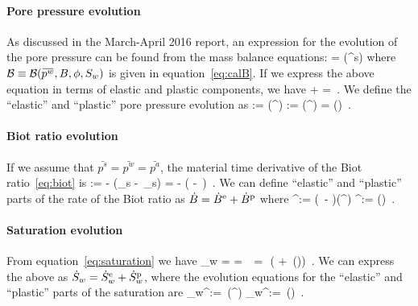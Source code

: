 \documentclass[11pt,a4paper]{article}
\begin{document}
  \paragraph{Pore pressure evolution}
  As discussed in the March-April 2016 report, an expression for the evolution of the pore pressure 
  can be found from the mass balance equations:
  \Beq
     =  \Tr(\BdT^s)
  \Eeq
  where $\CalB \equiv \CalB(\bar{p^w}, B, \phi, S_w)$ is given in equation~\eqref{eq:calB}.  
  If we express the above equation in terms of elastic and plastic components, we have
  \Beq
     +  = 
       \left[\Tr(\BdT^\Te) + \Tr(\BdT^\Tp)\right] \,.
  \Eeq
  We define the ``elastic'' and ``plastic'' pore pressure evolution as
  \BBeq
     := 
       \Tr(\BdT^\Te) \quad \Tand \quad
     :=  \Tr(\BdT^\Tp) = \frac{\lambdadot}{\CalB} \Tr(\BM) \,.
  \BEeq

  \paragraph{Biot ratio evolution}
  If we assume that $\bar{p^s} = \bar{p^w} = \bar{p^a}$, the material time derivative of the Biot 
  ratio~\eqref{eq:biot} is
  \Beq 
     := - \left(\dot{\Ktilde}_s - \,_s\right) 
      = - \left( - 
              \,\right) \,.
  \Eeq
  We can define ``elastic'' and ``plastic'' parts of the rate of the Biot ratio as 
  $\dot{B} = \dot{B}^{\text{e}} + \dot{B}^{\text{p}}$ where
  \BBeq
    ^\Te := \left(\, - 
          \right)\Tr(\BdT^\Te) \quad \Tand \quad
    ^\Tp := \lambdadot{}\Tr(\BM) \,.
  \BEeq

  \paragraph{Saturation evolution}
  From equation~\eqref{eq:saturation} we have
  \Beq
    _w =  
      = \,\, 
      = \,\,\left( + 
           \frac{\lambdadot}{\CalB}\,\Tr(\BM)\right) \,.
  \Eeq
  We can express the above as $\dot{S}_w = \dot{S}_w^{\text{e}} + \dot{S}_w^{\text{p}}$, where the evolution 
  equations for the ``elastic'' and ``plastic'' parts of the saturation are
  \BBeq
    _w^\Te := \,\Tr(\BdT^\Te)
    \quad \Tand \quad
    _w^\Tp := \lambdadot {}\,\Tr(\BM) \,.
  \BEeq
  
\end{document}
